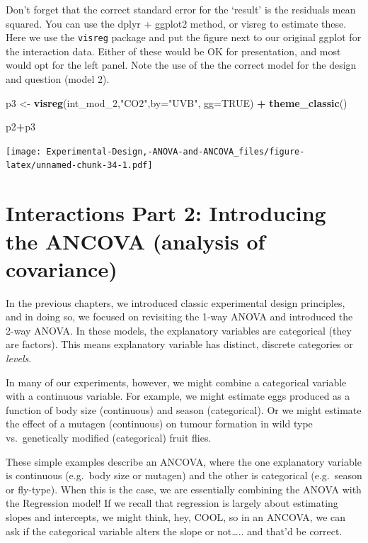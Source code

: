 \documentclass[
]{book}
\newenvironment{Shaded}{\begin{snugshade}}{\end{snugshade}}
\newcommand{\AttributeTok}[1]{\textcolor[rgb]{0.13,0.29,0.53}{#1}}
\newcommand{\ConstantTok}[1]{\textcolor[rgb]{0.56,0.35,0.01}{#1}}
\newcommand{\FunctionTok}[1]{\textcolor[rgb]{0.13,0.29,0.53}{\textbf{#1}}}
\newcommand{\NormalTok}[1]{#1}
\newcommand{\OtherTok}[1]{\textcolor[rgb]{0.56,0.35,0.01}{#1}}
\newcommand{\SpecialCharTok}[1]{\textcolor[rgb]{0.81,0.36,0.00}{\textbf{#1}}}
\newcommand{\StringTok}[1]{\textcolor[rgb]{0.31,0.60,0.02}{#1}}
\begin{document}
Don't forget that the correct standard error for the `result' is the residuals mean squared. You can use the dplyr + ggplot2 method, or visreg to estimate these. Here we use the \texttt{visreg} package and put the figure next to our original ggplot for the interaction data. Either of these would be OK for presentation, and most would opt for the left panel. Note the use of the the correct model for the design and question (model 2).

\begin{Shaded}
\begin{Highlighting}[]
\NormalTok{p3 }\OtherTok{\textless{}{-}} \FunctionTok{visreg}\NormalTok{(int\_mod\_2,}\StringTok{"CO2"}\NormalTok{,}\AttributeTok{by=}\StringTok{"UVB"}\NormalTok{, }\AttributeTok{gg=}\ConstantTok{TRUE}\NormalTok{) }\SpecialCharTok{+}
  \FunctionTok{theme\_classic}\NormalTok{()}

\NormalTok{p2}\SpecialCharTok{+}\NormalTok{p3}
\end{Highlighting}
\end{Shaded}

\texttt{[image: Experimental-Design,-ANOVA-and-ANCOVA\_files/figure-latex/unnamed-chunk-34-1.pdf]}

\hypertarget{interactions-part-2-introducing-the-ancova-analysis-of-covariance}{%
\chapter{Interactions Part 2: Introducing the ANCOVA (analysis of covariance)}\label{interactions-part-2-introducing-the-ancova-analysis-of-covariance}}

In the previous chapters, we introduced classic experimental design principles, and in doing so, we focused on revisiting the 1-way ANOVA and introduced the 2-way ANOVA. In these models, the explanatory variables are categorical (they are factors). This means explanatory variable has distinct, discrete categories or \emph{levels}.

In many of our experiments, however, we might combine a categorical variable with a continuous variable. For example, we might estimate eggs produced as a function of body size (continuous) and season (categorical). Or we might estimate the effect of a mutagen (continuous) on tumour formation in wild type vs.~genetically modified (categorical) fruit flies.

These simple examples describe an ANCOVA, where the one explanatory variable is continuous (e.g.~body size or mutagen) and the other is categorical (e.g.~season or fly-type). When this is the case, we are essentially combining the ANOVA with the Regression model! If we recall that regression is largely about estimating slopes and intercepts, we might think, hey, COOL, so in an ANCOVA, we can ask if the categorical variable alters the slope or not\ldots.. and that'd be correct.
\end{document}
